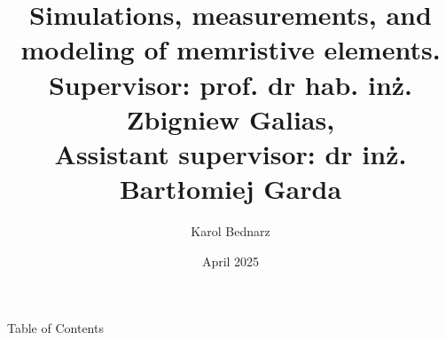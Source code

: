 \documentclass[aspectratio=1609]{beamer}
\title{Simulations, measurements, and modeling of memristive elements.\\
\small Supervisor: prof. dr hab. inż. Zbigniew Galias, \\
Assistant supervisor: dr inż. Bartłomiej Garda
}
\date{April 2025}
\author{Karol Bednarz}
\begin{document}
\begin{frame}
\titlepage
\end{frame}

\begin{frame}{Table of Contents}
    \tableofcontents
\end{frame}




\end{document}
